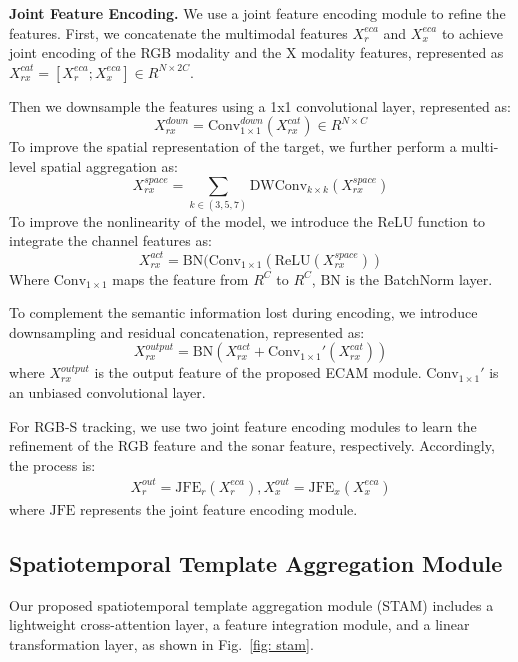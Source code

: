 \textbf{Joint Feature Encoding.} 
We use a joint feature encoding module to refine the features. First, we concatenate the multimodal features $X_{r}^{eca}$ and $X_{x}^{eca}$ to achieve joint encoding of the RGB modality and the X modality features, represented as $X_{rx}^{cat}=[X_{r}^{eca}; X_{x}^{eca}] \in R^{N\times 2C}$.

Then we downsample the features using a 1x1 convolutional layer, represented as:
\begin{equation}
X_{rx}^{down}=\text{Conv}_{1\times 1}^{down}(X_{rx}^{cat}) \in R^{N\times C}
\end{equation}
To improve the spatial representation of the target, we further perform a multi-level spatial aggregation as:
\begin{equation}
X_{rx}^{space}= \sum_{k\in (3,5,7)}\text{DWConv}_{k\times k}(X_{rx}^{space})
\end{equation}
To improve the nonlinearity of the model, we introduce the ReLU function to integrate the channel features as:
\begin{equation}
X_{rx}^{act}= \text{BN}(\text{Conv}_{1\times 1}(\text{ReLU}(X_{rx}^{space}))
\end{equation}
Where $\text{Conv}_{1\times 1}$ maps the feature from $R^{C}$ to $R^{C}$, $\text{BN}$ is the BatchNorm layer.

To complement the semantic information lost during encoding, we introduce downsampling and residual concatenation, represented as:
\begin{equation}
X_{rx}^{output}= \text{BN}(X_{rx}^{act}+\text{Conv}_{1\times 1}'(X_{rx}^{cat}))
\end{equation}
where $X_{rx}^{output}$ is the output feature of the proposed ECAM module. $\text{Conv}_{1\times 1}'$ is an unbiased convolutional layer.

For RGB-S tracking, we use two joint feature encoding modules to learn the refinement of the RGB feature and the sonar feature, respectively. Accordingly, the process is:
\begin{equation}
\begin{split}
X_{r}^{out}= \text{JFE}_{r}(X_{r}^{eca}), X_{x}^{out}=\text{JFE}_{x}(X_{x}^{eca})
\end{split}
\end{equation}
where $\text{JFE}$ represents the joint feature encoding module.

\subsection{Spatiotemporal Template Aggregation Module}
\label{section 3.3}
Our proposed spatiotemporal template aggregation module (STAM) includes a lightweight cross-attention layer, a feature integration module, and a linear transformation layer, as shown in Fig.~\ref{fig: stam}. 

